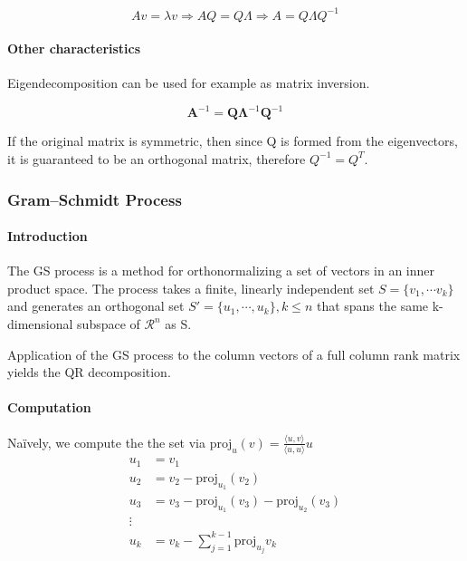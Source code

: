 \begin{equation*}
    Av = \lambda v \Rightarrow AQ = Q\Lambda \Rightarrow A = Q\Lambda Q^{-1}
\end{equation*}

\paragraph{Other characteristics} Eigendecomposition can be used for example as matrix
inversion.

\begin{equation*}
    \mathbf{A}^{-1} = \mathbf{Q}\mathbf{\Lambda}^{-1}\mathbf{Q}^{-1}
\end{equation*}

If the original matrix is symmetric, then since Q is formed from the eigenvectors, it is
guaranteed to be an orthogonal matrix, therefore $Q^{-1} = Q^T$.


\subsubsection{Gram–Schmidt Process}
\paragraph{Introduction} The GS process is a method for orthonormalizing a set of vectors in an inner product space.
The process takes a finite, linearly independent set $S = \{v_1, \dotsb v_k\}$
and generates an orthogonal set $S{'} = \{u_1, \dotsb, u_k\}, k \leq n$ that
spans the same k-dimensional subspace of $\mathcal{R}^n$ as S.

Application of the GS process to the column vectors of a full column rank matrix 
yields the QR decomposition. 

\paragraph{Computation} Na\"{i}vely, we compute the the set via
$\text{proj}_u(v) = \frac{\langle u, v \rangle}{\langle u, u \rangle}u$
\begin{equation*}
    \begin{split}
        u_1 & = v_1\\
        u_2 & = v_2 - \text{proj}_{u_1}(v_2)\\
        u_3 & = v_3 - \text{proj}_{u_1}(v_3) - \text{proj}_{u_2}(v_3)\\
        \vdots\\
        u_k & = v_k - \sum_{j=1}^{k-1} \text{proj}_{u_j}{v_k}
    \end{split}
\end{equation*}

